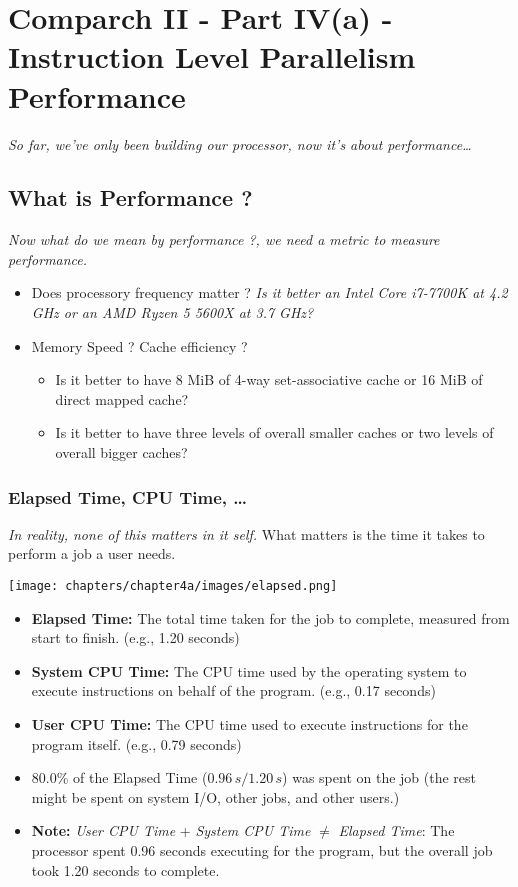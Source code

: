 \chapter{Comparch II - Part IV(a) - Instruction Level Parallelism Performance}
\textit{So far, we've only been building our processor, now it's about performance\dots}
\section{What is Performance ?}
\textit{Now what do we mean by performance ?, we need a metric to measure performance.}
\begin{itemize}
    \item[] Does processory frequency matter ? \textit{Is it better an Intel Core i7-7700K at 4.2 GHz or an AMD Ryzen 5 5600X at 3.7 GHz?}
    \item[] Memory Speed ? Cache efficiency ?
    \begin{itemize}
        \item[] Is it better to have 8 MiB of 4-way set-associative cache or 16 MiB of direct
        mapped cache?
        \item[] Is it better to have three levels of overall smaller caches or two levels of overall
        bigger caches?
    \end{itemize}
\end{itemize}
\subsection{Elapsed Time, CPU Time, \dots}
\textit{In reality, none of this matters in it self.}
What matters is the time it takes to perform a job a user needs.
\begin{center}
    \texttt{[image: chapters/chapter4a/images/elapsed.png]}
\end{center}

\begin{itemize}
    \item \textbf{Elapsed Time:} The total time taken for the job to complete, measured from start to finish. (e.g., 1.20 seconds)
    \item \textbf{System CPU Time:} The CPU time used by the operating system to execute instructions on behalf of the program. (e.g., 0.17 seconds)
    \item \textbf{User CPU Time:} The CPU time used to execute instructions for the program itself. (e.g., 0.79 seconds)
    \item 80.0\% of the Elapsed Time ($0.96\,s / 1.20\,s$) was spent on the job (the rest might be spent on system I/O, other jobs, and other users.)
    \item \textbf{Note:} \textit{User CPU Time} + \textit{System CPU Time} $\neq$ \textit{Elapsed Time}: The processor spent 0.96 seconds executing for the program, but the overall job took 1.20 seconds to complete.
\end{itemize}

